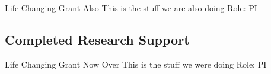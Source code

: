 \documentclass{nihbiosketch}
\begin{document}
      \bigskip
            
      {Life Changing Grant Also}
      {This is the stuff we are also doing}
      {Role: PI}
      
      \bigskip
          
      
  
    \subsection*{Completed Research Support}
  
          
      {Life Changing Grant Now Over}
      {This is the stuff we were doing}
      {Role: PI}
      
      \bigskip
      
  
\end{document}
